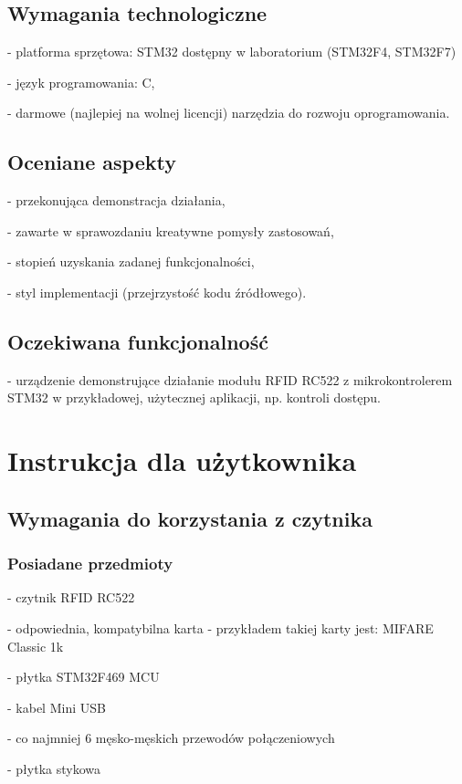 \documentclass[12pt,hidelinks]{article}
\begin{document}
    \subsection{Wymagania technologiczne}
    - platforma sprzętowa: STM32 dostępny w laboratorium (STM32F4, STM32F7)

    - język programowania: C,

    - darmowe (najlepiej na wolnej licencji) narzędzia do rozwoju oprogramowania.

    \subsection{Oceniane aspekty}
    - przekonująca demonstracja działania,

    - zawarte w sprawozdaniu kreatywne pomysły zastosowań,

    - stopień uzyskania zadanej funkcjonalności,

    - styl implementacji (przejrzystość kodu źródłowego).

    \subsection{Oczekiwana funkcjonalność}
    - urządzenie demonstrujące działanie modułu RFID RC522 z mikrokontrolerem STM32 w przykładowej, użytecznej aplikacji, np. kontroli dostępu.\,


    \section{Instrukcja dla użytkownika}
    \vspace{10.5cm}
    \subsection{Wymagania do korzystania z czytnika}
    \subsubsection{Posiadane przedmioty}
    - czytnik RFID RC522

    - odpowiednia, kompatybilna karta - przykładem takiej karty jest: MIFARE Classic 1k

    - płytka STM32F469 MCU

    - kabel Mini USB

    - co najmniej 6 męsko-męskich przewodów połączeniowych

    - płytka stykowa
\end{document}
